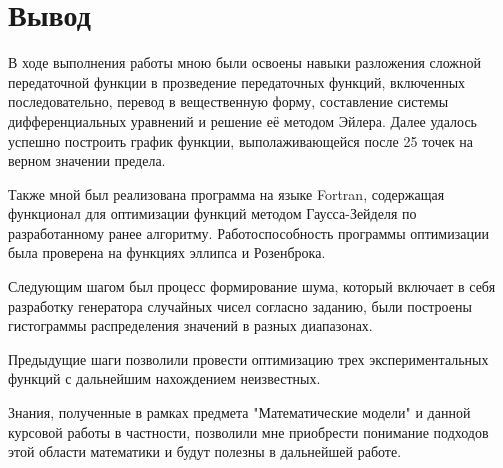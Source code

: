 \newpage
\part*{Вывод}
    В ходе выполнения работы мною были освоены навыки разложения сложной передаточной функции в прозведение передаточных функций, включенных последовательно, перевод в вещественную форму, составление системы дифференциальных уравнений и решение её методом Эйлера. Далее удалось успешно построить график функции, выполаживающейся после 25 точек на верном значении предела.

    Также мной был реализована программа на языке Fortran, содержащая функционал для оптимизации функций методом Гаусса-Зейделя по разработанному ранее алгоритму. Работоспособность программы оптимизации была проверена на функциях эллипса и Розенброка.

    Следующим шагом был процесс формирование шума, который включает в себя разработку генератора случайных чисел согласно заданию, были построены гистограммы распределения значений в разных диапазонах.

    Предыдущие шаги позволили провести оптимизацию трех экспериментальных функций с дальнейшим нахождением неизвестных.

    Знания, полученные в рамках предмета "Математические модели" и данной курсовой работы в частности, позволили мне приобрести понимание подходов этой области математики и будут полезны в дальнейшей работе.
